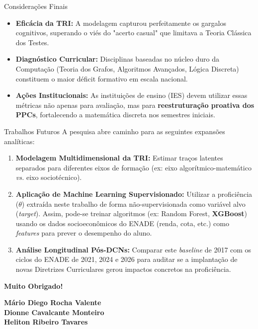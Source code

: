 \documentclass[10pt, aspectratio=169]{beamer}
\begin{document}
\begin{frame}{Considerações Finais}
    \begin{itemize}
        \item \textbf{Eficácia da TRI:} A modelagem capturou perfeitamente os gargalos cognitivos, superando o viés do "acerto casual" que limitava a Teoria Clássica dos Testes.
        \item \textbf{Diagnóstico Curricular:} Disciplinas baseadas no núcleo duro da Computação (Teoria dos Grafos, Algoritmos Avançados, Lógica Discreta) constituem o maior déficit formativo em escala nacional.
        \item \textbf{Ações Institucionais:} As instituições de ensino (IES) devem utilizar essas métricas não apenas para avaliação, mas para \textbf{reestruturação proativa dos PPCs}, fortalecendo a matemática discreta nos semestres iniciais.
    \end{itemize}
\end{frame}

\begin{frame}{Trabalhos Futuros}
    A pesquisa abre caminho para as seguintes expansões analíticas:
    \vspace{0.3cm}
    \begin{enumerate}
        \item \textbf{Modelagem Multidimensional da TRI:} Estimar traços latentes separados para diferentes eixos de formação (ex: eixo algorítmico-matemático \textit{vs.} eixo sociotécnico).
        
        \item \textbf{Aplicação de Machine Learning Supervisionado:} Utilizar a proficiência ($\theta$) extraída neste trabalho de forma não-supervisionada como variável alvo (\textit{target}). Assim, pode-se treinar algoritmos (ex: Random Forest, \textbf{XGBoost}) usando os dados socioeconômicos do ENADE (renda, cota, etc.) como \textit{features} para prever o desempenho do aluno.
        
        \item \textbf{Análise Longitudinal Pós-DCNs:} Comparar este \textit{baseline} de 2017 com os ciclos do ENADE de 2021, 2024 e 2026 para auditar se a implantação de novas Diretrizes Curriculares gerou impactos concretos na proficiência.
    \end{enumerate}
\end{frame}

\begin{frame}
    \centering
    \Huge \textbf{Muito Obrigado!}
    
    \vspace{1cm}
    \large \textbf{Mário Diego Rocha Valente} \\
     \large \textbf{Dionne Cavalcante Monteiro} \\
    \large \textbf{Heliton Ribeiro Tavares}
\end{frame}
\end{document}
